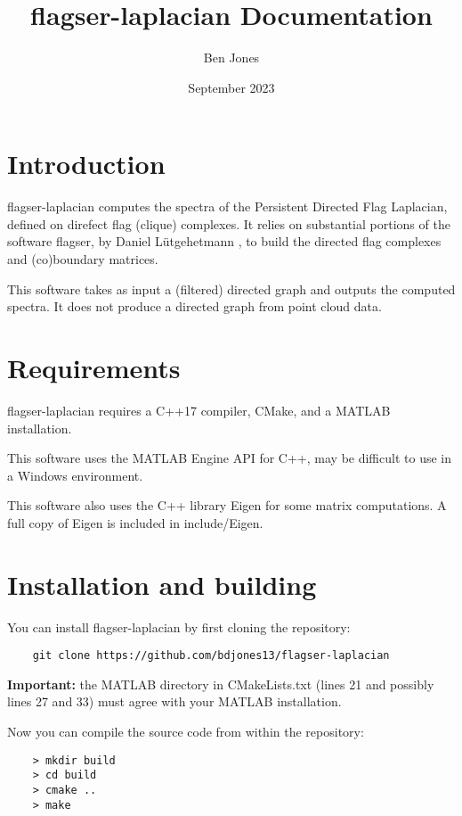 \documentclass{article}
\title{flagser-laplacian Documentation}
\author{Ben Jones}
\date{September 2023}
\begin{document}
\maketitle

\section{Introduction}
flagser-laplacian computes the spectra of the Persistent Directed Flag Laplacian, defined on direfect flag (clique) complexes. It relies on substantial portions of the software flagser, by Daniel L\"utgehetmann \cite{lutgehetmannComputingPersistentHomology2020}, to build the directed flag complexes and (co)boundary matrices. 

This software takes as input a (filtered) directed graph and outputs the computed spectra. It does not produce a directed graph from point cloud data.

\section{Requirements}
flagser-laplacian requires a C++17 compiler, CMake, and a MATLAB installation.

This software uses the MATLAB Engine API for C++, may be difficult to use in a Windows environment.

This software also uses the C++ library Eigen for some matrix computations. A full copy of Eigen is included in include/Eigen. 

\section{Installation and building}
You can install flagser-laplacian by first cloning the repository:

\begin{verbatim}
    git clone https://github.com/bdjones13/flagser-laplacian
\end{verbatim} 

\vspace{1em}
\textbf{Important:} the MATLAB directory in CMakeLists.txt (lines 21 and possibly lines 27 and 33) must agree with your MATLAB installation.
\vspace{1em}

Now you can compile the source code from within the repository: 

\begin{verbatim}
    > mkdir build
    > cd build
    > cmake ..
    > make
\end{verbatim}
\end{document}
